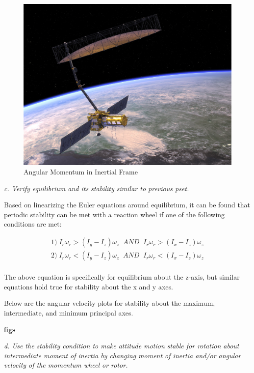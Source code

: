 \begin{figure}[H]
\centering
\includegraphics[scale=0.6]{Images/NISAR.jpg}
\caption{Angular Momentum in Inertial Frame}
\label{fig:ps4_problem3c_inertial}
\end{figure}

\textit{c. Verify equilibrium and its stability similar to previous pset.}

Based on linearizing the Euler equations around equilibrium, it can be found that periodic stability can be met with a reaction wheel if one of the following conditions are met:

\begin{align*}
    1)\; I_r \omega_r > (I_y - I_z) \omega_z \;\; AND \;\; I_r \omega_r > (I_x - I_z) \omega_z \\
    2)\; I_r \omega_r < (I_y - I_z) \omega_z \;\; AND \;\; I_r \omega_r < (I_x - I_z) \omega_z \\
\end{align*}

The above equation is specifically for equilibrium about the z-axis, but similar equations hold true for stability about the x and y axes.

Below are the angular velocity plots for stability about the maximum, intermediate, and minimum principal axes.

\textbf{figs}


\textit{d. Use the stability condition to make attitude motion stable for rotation about intermediate moment of inertia by changing moment of inertia and/or angular velocity of the momentum wheel or rotor.}




